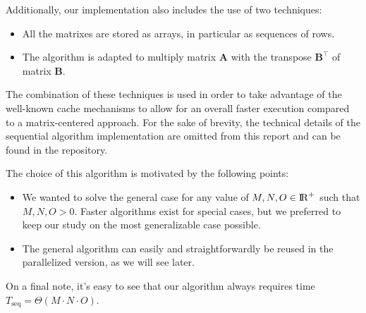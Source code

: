 Additionally, our implementation also includes the use of two techniques:
\begin{itemize}
    \item All the matrixes are stored as arrays, in particular as sequences of rows.
    \item The algorithm is adapted to multiply matrix $\textbf{A}$ with the transpose $\textbf{B}^\top$ of matrix $\textbf{B}$.
\end{itemize}
The combination of these techniques is used in order to take advantage of the well-known cache mechanisms to allow for an overall faster execution compared to a matrix-centered approach.
For the sake of brevity, the technical details of the sequential algorithm implementation are omitted from this report and can be found in the repository.

The choice of this algorithm is motivated by the following points:
\begin{itemize}
    \item We wanted to solve the general case for any value of $M,N,O \in {\rm I\!R}^+$ such that $M,N,O > 0$. Faster algorithms exist for special cases, but we preferred to keep our study on the most generalizable case possible.
    \item The general algorithm can easily and straightforwardly be reused in the parallelized version, as we will see later.
\end{itemize}

On a final note, it's easy to see that our algorithm always requires time $T_{\text{seq}} = \Theta(M\cdot N \cdot O)$.